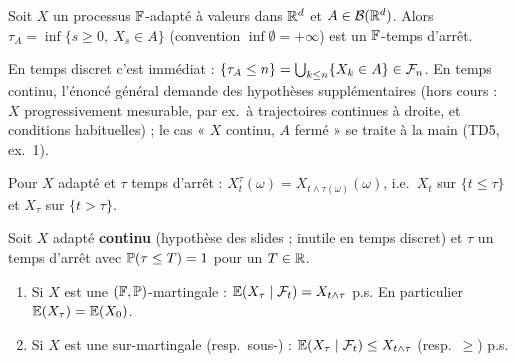 \documentclass[11pt,a4paper]{article}
\begin{document}
\begin{theoreme}\label{C8:entree}
Soit $X$ un processus $\mathbb{F}$-adapté à valeurs dans $\mathbb{R}^d$ et $A\in\mathcal{B}(\mathbb{R}^d)$. Alors
$\tau_A=\inf\{s\ge0,\ X_s\in A\}$ (convention $\inf\emptyset=+\infty$) est un $\mathbb{F}$-temps d'arrêt.
\end{theoreme}
\begin{remarque}
En temps discret c'est immédiat : $\{\tau_A\le n\}=\bigcup_{k\le n}\{X_k\in A\}\in\mathcal{F}_n$.
En temps continu, l'énoncé général demande des hypothèses supplémentaires (hors cours : $X$ progressivement mesurable, par ex.\ à trajectoires continues à droite, et conditions habituelles) ;
le cas « $X$ continu, $A$ fermé » se traite à la main (TD5, ex.~1).
\end{remarque}

\begin{definition}\label{C8:arrete}
Pour $X$ adapté et $\tau$ temps d'arrêt : $X^\tau_t(\omega)=X_{t\wedge\tau(\omega)}(\omega)$, i.e.\ $X_t$ sur $\{t\le\tau\}$ et $X_\tau$ sur $\{t>\tau\}$.
\end{definition}

\begin{theoreme}\label{C8:arret}
Soit $X$ adapté \textbf{continu} (hypothèse des slides ; inutile en temps discret) et $\tau$ un temps d'arrêt avec $\mathbb{P}(\tau\le T)=1$ pour un $T\in\mathbb{R}$.
\begin{enumerate}
  \item Si $X$ est une $(\mathbb{F},\mathbb{P})$-martingale : $\mathbb{E}(X_\tau\mid\mathcal{F}_t)=X_{t\wedge\tau}$ p.s. En particulier $\mathbb{E}(X_\tau)=\mathbb{E}(X_0)$.
  \item Si $X$ est une sur-martingale (resp.\ sous-) : $\mathbb{E}(X_\tau\mid\mathcal{F}_t)\le X_{t\wedge\tau}$ (resp.\ $\ge$) p.s.
\end{enumerate}
\end{theoreme}
\end{document}
